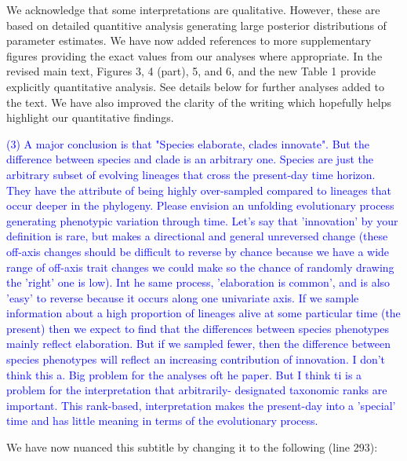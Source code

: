 \documentclass[12pt,letterpaper]{article}
\begin{document}
{We acknowledge that some interpretations are qualitative. However, these are based on detailed quantitive analysis generating large posterior distributions of parameter estimates. We have now added references to more supplementary figures providing the exact values from our analyses where appropriate. In the revised main text, Figures 3, 4 (part), 5, and 6, and the new Table 1 provide explicitly quantitative analysis. See details below for further analyses added to the text. We have also improved the clarity of the writing which hopefully helps highlight our quantitative findings.

\textcolor{blue}{(3) A major conclusion is that "Species elaborate, clades innovate". But the difference between species and clade is an arbitrary one. Species are just the arbitrary subset of evolving lineages that cross the present-day time horizon. They have the attribute of being highly over-sampled compared to lineages that occur deeper in the phylogeny. Please envision an unfolding evolutionary process generating phenotypic variation through time. Let's say that 'innovation' by your definition is rare, but makes a directional and general unreversed change (these off-axis changes should be difficult to reverse by chance because we have a wide range of off-axis trait changes we could make so the chance of randomly drawing the 'right' one is low). Int he same process, 'elaboration is common', and is also 'easy' to reverse because it occurs along one univariate axis. If we sample information about a high proportion of lineages alive at some particular time (the present) then we expect to find that the differences between species phenotypes mainly reflect elaboration. But if we sampled fewer, then the difference between species phenotypes will reflect an increasing contribution of innovation. I don't think this a. Big problem for the analyses oft he paper. But I think ti is a problem for the interpretation that arbitrarily- designated taxonomic ranks are important. This rank-based, interpretation makes the present-day into a 'special' time and has little meaning in terms of the evolutionary process.}

We have now nuanced this subtitle by changing it to the following (line 293):


}
\end{document}
